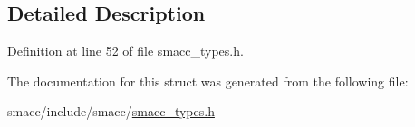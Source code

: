 \subsection{Detailed Description}


Definition at line 52 of file smacc\+\_\+types.\+h.



The documentation for this struct was generated from the following file\+:\begin{DoxyCompactItemize}
\item 
smacc/include/smacc/\hyperlink{smacc__types_8h}{smacc\+\_\+types.\+h}\end{DoxyCompactItemize}
